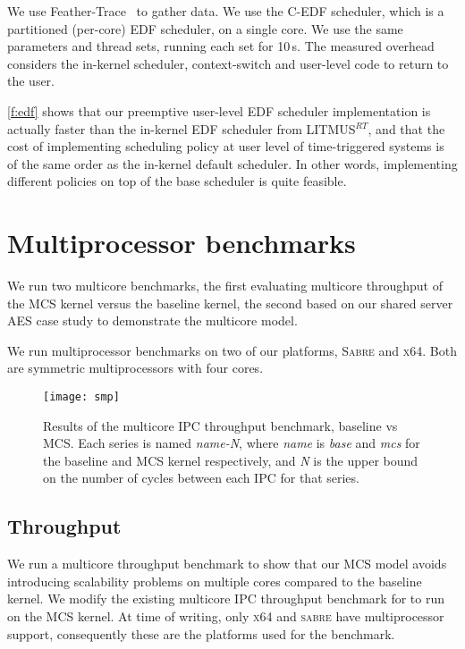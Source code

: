 We use Feather-Trace~\citep{Brandenburg_Anderson_07} to gather data.
We use the C-EDF scheduler, which is a partitioned (per-core) EDF scheduler, on a single
core. We use the same parameters and thread sets, running each set for 10\,s. 
The measured overhead considers the in-kernel scheduler, context-switch and user-level code to return to
the user.

\autoref{f:edf} shows that our preemptive user-level EDF scheduler implementation is
actually faster than the in-kernel EDF scheduler from LITMUS$^{RT}$, and
that the cost of implementing scheduling policy at user level of time-triggered systems is of
the same order as the in-kernel default scheduler. In other words,
implementing different policies on top of the base scheduler is quite feasible.
\section{Multiprocessor benchmarks}

We run two multicore benchmarks, the first evaluating multicore throughput of the MCS kernel versus the
baseline kernel, the second based on our shared server \gls{AES} case study to demonstrate the
multicore model. 

We run multiprocessor benchmarks on two of our platforms, \textsc{Sabre} and \textsc{x64}. Both 
are symmetric multiprocessors with four cores. 

\begin{figure}[t] 
    \centering
    \texttt{[image: smp]}
    \caption[Results of the multicore IPC throughput benchmark.]{Results of the multicore IPC throughput benchmark, baseline \selfour vs MCS. 
        Each series is named \textit{name-N}, where \textit{name} is \textit{base} and \textit{mcs} for 
        the baseline and MCS kernel respectively, and \textit{N} is the upper
        bound on the number of cycles between each IPC for that series.}
    \label{f:evaluation-smp}
\end{figure}

\subsection{Throughput}

We run a multicore throughput benchmark to show that our MCS model
avoids introducing scalability problems on multiple cores compared to the baseline kernel.
We modify the
existing multicore IPC throughput benchmark for \selfour to run on the MCS kernel. 
At time of writing, only \textsc{x64} and \textsc{sabre} have \selfour multiprocessor support, 
consequently these are the platforms used for the benchmark.

